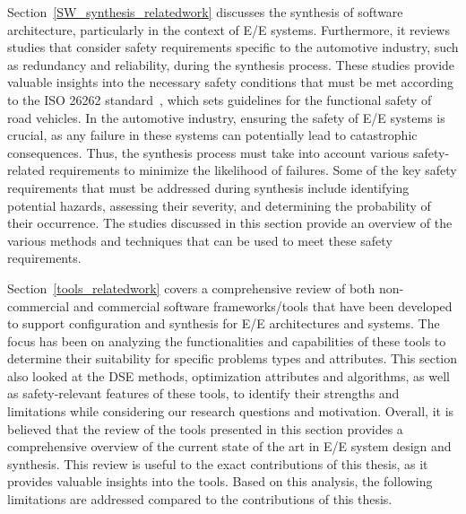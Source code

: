 Section~\ref{SW_synthesis_relatedwork} discusses the synthesis of software architecture, particularly in the context of E/E systems. Furthermore, it reviews studies that consider safety requirements specific to the automotive industry, such as redundancy and reliability, during the synthesis process. These studies provide valuable insights into the necessary safety conditions that must be met according to the ISO 26262 standard~\cite{iso26262}, which sets guidelines for the functional safety of road vehicles.
In the automotive industry, ensuring the safety of E/E systems is crucial, as any failure in these systems can potentially lead to catastrophic consequences. Thus, the synthesis process must take into account various safety-related requirements to minimize the likelihood of failures. Some of the key safety requirements that must be addressed during synthesis include identifying potential hazards, assessing their severity, and determining the probability of their occurrence. The studies discussed in this section provide an overview of the various methods and techniques that can be used to meet these safety requirements.


 Section~\ref{tools_relatedwork} covers a comprehensive review of both non-commercial and commercial software frameworks/tools that have been developed to support configuration and synthesis for E/E architectures and systems. The focus has been on analyzing the functionalities and capabilities of these tools to determine their suitability for specific problems types and attributes. This section also looked at the DSE methods, optimization attributes and algorithms, as well as safety-relevant features of these tools, to identify their strengths and limitations while considering our research questions and motivation.
Overall, it is believed that the review of the tools presented in this section provides a comprehensive overview of the current state of the art in E/E system design and synthesis. This review is useful to the exact contributions of this thesis, as it provides valuable insights into the tools.
Based on this analysis, the following limitations are addressed compared to the contributions of this thesis.

